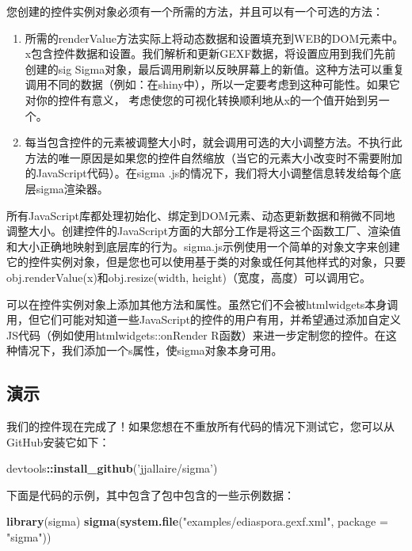 \documentclass[]{book}
\newenvironment{Shaded}{\begin{snugshade}}{\end{snugshade}}
\newcommand{\KeywordTok}[1]{\textcolor[rgb]{0.13,0.29,0.53}{\textbf{#1}}}
\newcommand{\DataTypeTok}[1]{\textcolor[rgb]{0.13,0.29,0.53}{#1}}
\newcommand{\StringTok}[1]{\textcolor[rgb]{0.31,0.60,0.02}{#1}}
\newcommand{\OperatorTok}[1]{\textcolor[rgb]{0.81,0.36,0.00}{\textbf{#1}}}
\newcommand{\NormalTok}[1]{#1}
\theoremstyle{definition}
\theoremstyle{definition}
\theoremstyle{definition}
\theoremstyle{remark}
\begin{document}
您创建的控件实例对象必须有一个所需的方法，并且可以有一个可选的方法：

\begin{enumerate}
\def\labelenumi{\arabic{enumi}.}
\item
  所需的renderValue方法实际上将动态数据和设置填充到WEB的DOM元素中。x包含控件数据和设置。我们解析和更新GEXF数据，将设置应用到我们先前创建的sig
  Sigma对象，最后调用刷新以反映屏幕上的新值。这种方法可以重复调用不同的数据（例如：在shiny中），所以一定要考虑到这种可能性。如果它对你的控件有意义，
  考虑使您的可视化转换顺利地从x的一个值开始到另一个。
\item
  每当包含控件的元素被调整大小时，就会调用可选的大小调整方法。不执行此方法的唯一原因是如果您的控件自然缩放（当它的元素大小改变时不需要附加的JavaScript代码）。在sigma
  .js的情况下，我们将大小调整信息转发给每个底层sigma渲染器。
\end{enumerate}

所有JavaScript库都处理初始化、绑定到DOM元素、动态更新数据和稍微不同地调整大小。创建控件的JavaScript方面的大部分工作是将这三个函数工厂、渲染值和大小正确地映射到底层库的行为。sigma.js示例使用一个简单的对象文字来创建它的控件实例对象，但是您也可以使用基于类的对象或任何其他样式的对象，只要obj.renderValue(x)和obj.resize(width,
height)（宽度，高度）可以调用它。

可以在控件实例对象上添加其他方法和属性。虽然它们不会被htmlwidgets本身调用，但它们可能对知道一些JavaScript的控件的用户有用，并希望通过添加自定义JS代码（例如使用htmlwidgets::onRender
R函数）来进一步定制您的控件。在这种情况下，我们添加一个s属性，使sigma对象本身可用。

\subsection{演示}

我们的控件现在完成了！如果您想在不重放所有代码的情况下测试它，您可以从GitHub安装它如下：

\begin{Shaded}
\begin{Highlighting}[]
\NormalTok{devtools}\OperatorTok{::}\KeywordTok{install_github}\NormalTok{(}\StringTok{'jjallaire/sigma'}\NormalTok{)}
\end{Highlighting}
\end{Shaded}

下面是代码的示例，其中包含了包中包含的一些示例数据：

\begin{Shaded}
\begin{Highlighting}[]
\KeywordTok{library}\NormalTok{(sigma)}
\KeywordTok{sigma}\NormalTok{(}\KeywordTok{system.file}\NormalTok{(}\StringTok{"examples/ediaspora.gexf.xml"}\NormalTok{, }\DataTypeTok{package =} \StringTok{"sigma"}\NormalTok{))}
\end{Highlighting}
\end{Shaded}
\end{document}
